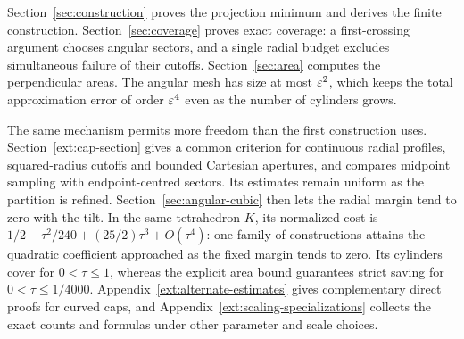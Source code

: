 Section~\ref{sec:construction} proves the projection minimum and derives
the finite construction. Section~\ref{sec:coverage} proves exact coverage:
a first-crossing argument chooses angular sectors, and a single radial
budget excludes simultaneous failure of their cutoffs.
Section~\ref{sec:area} computes the perpendicular areas. The angular mesh
has size at most $\varepsilon^2$, which keeps the total approximation error of
order $\varepsilon^4$ even as the number of cylinders grows.

The same mechanism permits more freedom than the first construction
uses. Section~\ref{ext:cap-section} gives a common criterion for
continuous radial profiles, squared-radius cutoffs and bounded Cartesian
apertures, and compares midpoint sampling with endpoint-centred sectors.
Its estimates remain uniform as the partition is refined.
Section~\ref{sec:angular-cubic} then lets the radial margin tend to zero
with the tilt. In the same tetrahedron $K$, its normalized cost is
$1/2-\tau^2/240+(25/2)\tau^3+O(\tau^4)$: one family of constructions
attains the quadratic coefficient approached as the fixed margin tends
to zero. Its cylinders cover for $0<\tau\le1$, whereas the explicit
area bound guarantees strict saving for $0<\tau\le1/4000$.
Appendix~\ref{ext:alternate-estimates} gives complementary direct
proofs for curved caps, and Appendix~\ref{ext:scaling-specializations}
collects the exact counts and formulas under other parameter and scale
choices.
